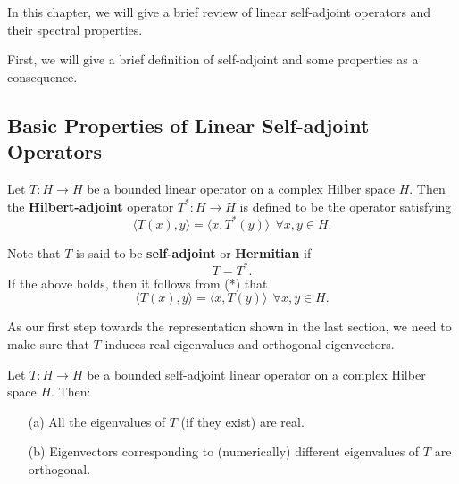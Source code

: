 In this chapter, we will give a brief review of linear self-adjoint operators and their spectral properties.

First, we will give a brief definition of self-adjoint and some properties as a consequence.

\subsection{Basic Properties of Linear Self-adjoint Operators}

\begin{definition}
    Let \( T: H \to H  \) be a bounded linear operator on  a complex Hilber space \( H  \). Then the \textbf{Hilbert-adjoint} operator \( T^{*} : H \to H  \) is defined to be the operator satisfying
    \[  \langle T(x) , y \rangle = \langle x ,  T^{*}(y) \rangle \ \ \forall x,y \in H. \tag{*}  \]
\end{definition}

Note that \( T  \) is said to be \textbf{self-adjoint} or \textbf{Hermitian} if 
\[  T = T^{*}. \]
If the above holds, then it follows from (*) that 
\[ \langle T(x) , y \rangle = \langle x  ,  T(y) \rangle \ \ \forall  x,y \in H.\]

As our first step towards the representation shown in the last section, we need to make sure that \( T  \) induces real eigenvalues and orthogonal eigenvectors.

\begin{theorem}
    Let \( T: H \to H  \) be a bounded self-adjoint linear operator on a complex Hilber space \( H  \). Then:
    \begin{enumerate}
        \item[(a)] All the eigenvalues of \( T  \) (if they exist) are real.
        \item[(b)] Eigenvectors corresponding to (numerically) different eigenvalues of \( T  \) are orthogonal.
    \end{enumerate}
\end{theorem}

